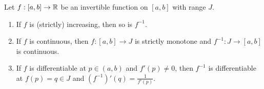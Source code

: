 \documentclass[12pt]{article}
\begin{document}
\begin{thm} \label{thm:inverse fn}
    Let $f : [a, b] \to \mathbb{R}$ be an invertible function on $[a, b]$ with range $J$.
    \begin{enumerate}[label=(\roman*)]
        \item If $f$ is (strictly) increasing, then so is $f^{-1}$.
        \item If $f$ is continuous, then $f : [a, b] \to J$ is strictly monotone and $f^{-1} : J \to [a, b]$ is continuous.
        \item If $f$ is differentiable at $p \in (a, b)$ and $f'(p) \neq 0$, then $f^{-1}$ is differentiable at $f(p) = q \in J$ and $(f^{-1})'(q) = \frac{1}{f'(p)}$.
    \end{enumerate}
\end{thm}
\end{document}
